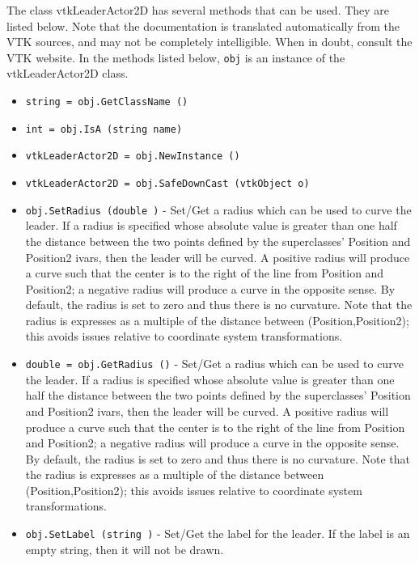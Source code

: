 The class vtkLeaderActor2D has several methods that can be used.
  They are listed below.
Note that the documentation is translated automatically from the VTK sources,
and may not be completely intelligible.  When in doubt, consult the VTK website.
In the methods listed below, \verb|obj| is an instance of the vtkLeaderActor2D class.
\begin{itemize}
\item  \verb|string = obj.GetClassName ()|

\item  \verb|int = obj.IsA (string name)|

\item  \verb|vtkLeaderActor2D = obj.NewInstance ()|

\item  \verb|vtkLeaderActor2D = obj.SafeDownCast (vtkObject o)|

\item  \verb|obj.SetRadius (double )| -  Set/Get a radius which can be used to curve the leader.  If a radius is
 specified whose absolute value is greater than one half the distance
 between the two points defined by the superclasses' Position and
 Position2 ivars, then the leader will be curved. A positive radius will
 produce a curve such that the center is to the right of the line from
 Position and Position2; a negative radius will produce a curve in the 
 opposite sense. By default, the radius is set to zero and thus there
 is no curvature. Note that the radius is expresses as a multiple of
 the distance between (Position,Position2); this avoids issues relative
 to coordinate system transformations.

\item  \verb|double = obj.GetRadius ()| -  Set/Get a radius which can be used to curve the leader.  If a radius is
 specified whose absolute value is greater than one half the distance
 between the two points defined by the superclasses' Position and
 Position2 ivars, then the leader will be curved. A positive radius will
 produce a curve such that the center is to the right of the line from
 Position and Position2; a negative radius will produce a curve in the 
 opposite sense. By default, the radius is set to zero and thus there
 is no curvature. Note that the radius is expresses as a multiple of
 the distance between (Position,Position2); this avoids issues relative
 to coordinate system transformations.

\item  \verb|obj.SetLabel (string )| -  Set/Get the label for the leader. If the label is an empty string, then
 it will not be drawn.


\end{itemize}
